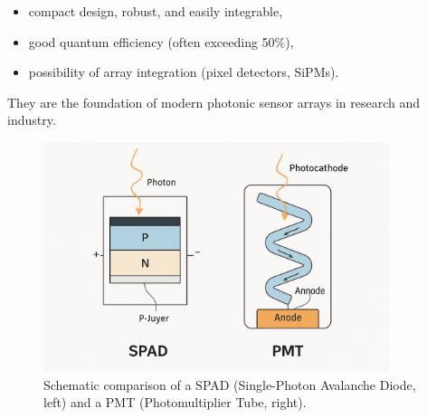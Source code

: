 \begin{itemize}
	\item compact design, robust, and easily integrable,
	\item good quantum efficiency (often exceeding 50\%),
	\item possibility of array integration (pixel detectors, SiPMs).
\end{itemize}
\newpage
\noindent
They are the foundation of modern photonic sensor arrays in research and industry.
\begin{figure}[H]
	\centering
	\includegraphics[width=0.9\textwidth]{bilder/SPAD-PMT.png}
	\caption{Schematic comparison of a SPAD (Single-Photon Avalanche Diode, left) and a PMT (Photomultiplier Tube, right). }
	\label{fig:spad_pmt}
\end{figure}
